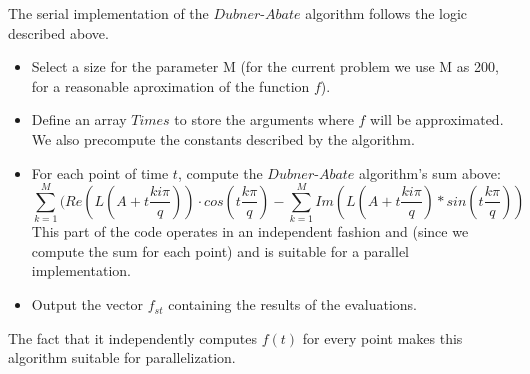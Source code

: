The serial implementation of the $Dubner$-$Abate$ algorithm follows the logic described above.
\begin{itemize}
\item{Select a size for the parameter M (for the current problem we use M as 200, for a reasonable aproximation of the function $f$).}
\item{Define an array $Times$ to store the arguments where $f$ will be approximated. We also precompute the constants described by the algorithm.} 
\item{For each point of time $t$, compute the $Dubner$-$Abate$ algorithm's sum above:
$$\sum\limits_{k=1}^{M} {(Re(L(A+t\frac{ki\pi}{q})) \cdot cos(t\frac{k\pi}{q})} - \sum\limits_{k=1}^{M}{Im(L(A+t\frac{ki\pi}{q})* sin(t\frac{k\pi}{q}) )}$$
This part of the code operates in an independent fashion and (since we compute the sum for each point) and is suitable for a parallel implementation.}
\item{Output the vector $f_{st}$ containing the results of the evaluations.}
\end{itemize}
The fact that it independently computes $f(t)$  for every point makes this algorithm suitable for parallelization.








